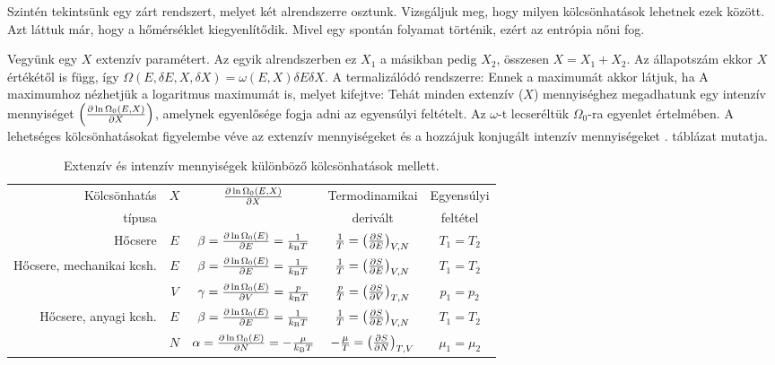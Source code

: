    Szintén tekintsünk egy zárt rendszert, melyet két alrendszerre osztunk. Vizsgáljuk meg, hogy milyen kölcsönhatások lehetnek ezek között. Azt láttuk már, hogy a hőmérséklet kiegyenlítődik. Mivel egy spontán folyamat történik, ezért az entrópia nőni fog.
   
   Vegyünk egy $X$ extenzív paramétert. Az egyik alrendszerben ez $X_1$ a másikban pedig $X_2$, összesen $X=X_1+X_2$. Az állapotszám ekkor $X$ értékétől is függ, így $\Omega(E,\delta E,X,\delta X)=\omega(E,X)\delta E\delta X$. A termalizálódó rendszerre:
   Ennek a maximumát akkor látjuk, ha
   A maximumhoz nézhetjük a logaritmus maximumát is, melyet kifejtve:
   Tehát minden extenzív ($X$) mennyiséghez megadhatunk egy intenzív mennyiséget $\left(\frac{\partial \ln\Omega_0(E,X)}{\partial X}\right)$, amelynek egyenlősége fogja adni az egyensúlyi feltételt. Az $\omega$-t lecseréltük $\Omega_0$-ra  egyenlet értelmében. A lehetséges kölcsönhatásokat figyelembe véve az extenzív mennyiségeket és a hozzájuk konjugált intenzív mennyiségeket . táblázat mutatja.
   \begin{table}[ht!]
    \centering
    \begin{tabular}{r|cc|c|c}
     Kölcsönhatás  & \multirow{2}{*}{$X$}& \multirow{2}{*}{$\frac{\partial \ln\Omega_0(E,X)}{\partial X}$} & Termodinamikai& Egyensúlyi   \\
     típusa &  &  & derivált & feltétel  \\ \hline\hline
     Hőcsere & $E$ & $\beta=\frac{\partial \ln\Omega_0(E)}{\partial E}=\frac{1}{k_\text{B} T}$ & $\frac{1}{T}=\left(\frac{\partial S}{\partial E}\right)_{V,N}$ & $T_1=T_2$\\ \hline
     \multirow{2}{*}{Hőcsere, mechanikai kcsh.} & $E$ & $\beta=\frac{\partial \ln\Omega_0(E)}{\partial E}=\frac{1}{k_\text{B} T}$ & $\frac{1}{T}=\left(\frac{\partial S}{\partial E}\right)_{V,N}$ & $T_1=T_2$\\
      & $V$ & $\gamma=\frac{\partial \ln\Omega_0(E)}{\partial V}=\frac{p}{k_\text{B} T}$ & $\frac{p}{T}=\left(\frac{\partial S}{\partial V}\right)_{T,N}$ & $p_1=p_2$\\ \hline
      \multirow{2}{*}{Hőcsere, anyagi kcsh.} & $E$ & $\beta=\frac{\partial \ln\Omega_0(E)}{\partial E}=\frac{1}{k_\text{B} T}$ & $\frac{1}{T}=\left(\frac{\partial S}{\partial E}\right)_{V,N}$ & $T_1=T_2$\\
      & $N$ & $\alpha=\frac{\partial \ln\Omega_0(E)}{\partial N}=-\frac{\mu}{k_\text{B} T}$ & $-\frac{\mu}{T}=\left(\frac{\partial S}{\partial N}\right)_{T,V}$ & $\mu_1=\mu_2$
    \end{tabular}
    \caption{Extenzív és intenzív mennyiségek különböző kölcsönhatások mellett.}\label{tabl:B09-extint}
   \end{table}
   
